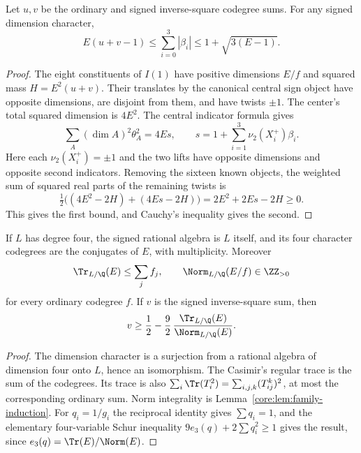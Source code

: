 \begin{lemma}\label{core:lem:family-signed-second}
Let $u,v$ be the ordinary and signed inverse-square codegree sums.
For any signed dimension character,
\[
 E(u+v-1)\le\sum_{i=0}^3|\beta_i|
 \le1+\sqrt{3(E-1)}.
\]
\end{lemma}
\begin{proof}
The eight constituents of $I(1)$ have positive dimensions $E/f$
and squared mass $H=E^2(u+v)$. Their translates by the canonical
central sign object have opposite dimensions, are disjoint from
them, and have twists $\pm1$. The center's total squared dimension
is $4E^2$. The central indicator formula
\cite[Theorem~4.1]{NS} gives
\[
 \sum_A (\dim A)^2\theta_A^2=4Es,
 \qquad s=1+\sum_{i=1}^3\nu_2(X_i^+)\beta_i.
\]
Here each $\nu_2(X_i^+)=\pm1$ and the two lifts have opposite
dimensions and opposite second indicators. Removing the sixteen
known objects, the weighted sum of squared real parts of the
remaining twists is
\[
 \tfrac12\bigl((4E^2-2H)+(4Es-2H)\bigr)
 =2E^2+2Es-2H\ge0.
\]
This gives the first bound, and Cauchy's inequality gives the second.
\end{proof}
\begin{lemma}\label{core:lem:family-trace-norm}
If $L$ has degree four, the signed rational algebra is $L$ itself,
and its four character codegrees are the conjugates of $E$, with
multiplicity. Moreover
\[
 \Tr_{L/\Q}(E)\le\sum_j f_j,
 \qquad \Norm_{L/\Q}(E/f)\in\ZZ_{>0}
\]
for every ordinary codegree $f$. If $v$ is the signed inverse-square
sum, then
\[
 v\ge\frac12-\frac92\,
 \frac{\Tr_{L/\Q}(E)}{\Norm_{L/\Q}(E)}.
\]
\end{lemma}
\begin{proof}
The dimension character is a surjection from a rational algebra of
dimension four onto $L$, hence an isomorphism. The Casimir's regular
trace is the sum of the codegrees. Its trace is also
$\sum_i\Tr(T_i^2)=\sum_{i,j,k}(T_{ij}^k)^2$, at most the
corresponding ordinary sum. Norm integrality is
Lemma~\ref{core:lem:family-induction}. For $q_i=1/g_i$ the reciprocal
identity gives $\sum q_i=1$, and the elementary four-variable
Schur inequality $9e_3(q)+2\sum q_i^2\ge1$ gives the result,
since $e_3(q)=\Tr(E)/\Norm(E)$.
\end{proof}


